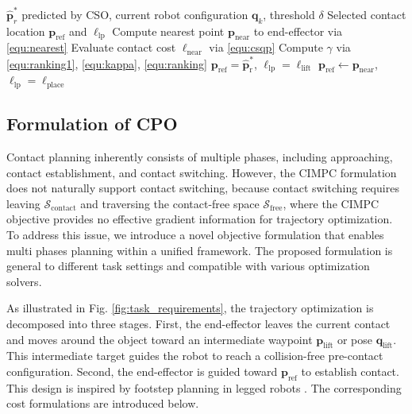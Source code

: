 \begin{algorithm}[t]
\caption{Ranking Strategy of CPO}
\label{algo:ranking}
\begin{algorithmic}[1]
\Require $\boldsymbol{\hat{p}}^*_r$ predicted by CSO, current robot configuration $\boldsymbol{q}_k$, threshold $\delta$
\Ensure Selected contact location $\boldsymbol{p}_{\text{ref}}$ and $\ell_{\text{lp}}$
\State Compute nearest point $\boldsymbol{p}_{\text{near}}$ to end-effector via \eqref{equ:nearest}
\State Evaluate contact cost $\ell_{\text{near}}$ via \eqref{equ:csqp}
\State Compute $\gamma$ via \eqref{equ:ranking1}, \eqref{equ:kappa}, \eqref{equ:ranking} 
 \State $\boldsymbol{p}_{\text{ref}} = \boldsymbol{\hat{p}}^*_{\text{r}}$, $\ell_{\text{lp}}=\ell_{\text{lift}}$ 
\Else
 \State $\boldsymbol{p}_{\text{ref}} \gets \boldsymbol{p}_{\text{near}}$, $\ell_{\text{lp}}=\ell_{\text{place}}$ 
\EndIf
\end{algorithmic}
\end{algorithm}

\subsection{Formulation of CPO}

Contact planning inherently consists of multiple phases, including approaching, contact establishment, and contact switching. However, the CIMPC formulation does not naturally support contact switching, because contact switching requires leaving $\mathcal{S}_{\text{contact}}$ and traversing the contact-free space $\mathcal{S}_{\text{free}}$, where the CIMPC objective provides no effective gradient information for trajectory optimization. To address this issue, we introduce a novel objective formulation that enables multi phases planning within a unified framework. The proposed formulation is general to different task settings and compatible with various optimization solvers.

As illustrated in Fig. \ref{fig:task_requirements}, the trajectory optimization is decomposed into three stages. First, the end-effector leaves the current contact and moves around the object toward an intermediate waypoint $\boldsymbol{p}_{\text{lift}}$ or pose $\boldsymbol{q}_{\text{lift}}$. This intermediate target guides the robot to reach a collision-free pre-contact configuration. Second, the end-effector is guided toward $\boldsymbol{p}_{\text{ref}}$ to establish contact. This design is inspired by footstep planning in legged robots \cite{acosta2025perceptive}. The corresponding cost formulations are introduced below.

